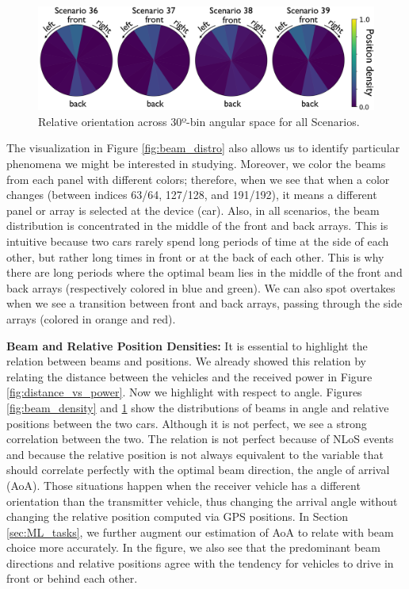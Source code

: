 \documentclass[10pt,comsoc]{IEEEtran}
\begin{document}
\begin{figure}[!t]
	\centering
	\includegraphics[width=1\columnwidth]{pos_density6}
	\caption{Relative orientation across 30º-bin angular space for all Scenarios.}
	\label{fig:pos_density}
	\vspace*{-.1cm}
\end{figure}

The visualization in Figure \ref{fig:beam_distro} also allows us to identify particular phenomena we might be interested in studying. Moreover, we color the beams from each panel with different colors; therefore, when we see that when a color changes (between indices 63/64, 127/128, and 191/192), it means a different panel or array is selected at the device (car). Also, in all scenarios, the beam distribution is concentrated in the middle of the front and back arrays. This is intuitive because two cars rarely spend long periods of time at the side of each other, but rather long times in front or at the back of each other. This is why there are long periods where the optimal beam lies in the middle of the front and back arrays (respectively colored in blue and green). We can also spot overtakes when we see a transition between front and back arrays, passing through the side arrays (colored in orange and red).


\textbf{Beam and Relative Position Densities:} It is essential to highlight the relation between beams and positions. We already showed this relation by relating the distance between the vehicles and the received power in Figure \ref{fig:distance_vs_power}. Now we highlight with respect to angle. Figures \ref{fig:beam_density} and \ref{fig:pos_density} show the distributions of beams in angle and relative positions between the two cars. Although it is not perfect, we see a strong correlation between the two. The relation is not perfect because of NLoS events and because the relative position is not always equivalent to the variable that should correlate perfectly with the optimal beam direction, the angle of arrival (AoA). Those situations happen when the receiver vehicle has a different orientation than the transmitter vehicle, thus changing the arrival angle without changing the relative position computed via GPS positions. In Section \ref{sec:ML_tasks}, we further augment our estimation of AoA to relate with beam choice more accurately. In the figure, we also see that the predominant beam directions and relative positions agree with the tendency for vehicles to drive in front or behind each other. 
\end{document}
